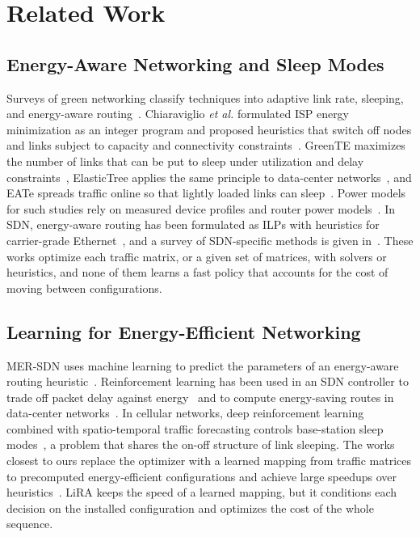 \documentclass[journal]{IEEEtran}
\begin{document}
\section{Related Work}\label{sec:related}

\subsection{Energy-Aware Networking and Sleep Modes}

Surveys of green networking classify techniques into adaptive link rate, sleeping, and energy-aware routing~\cite{bianzino2012survey,bolla2011energy}. Chiaraviglio \emph{et al.} formulated ISP energy minimization as an integer program and proposed heuristics that switch off nodes and links subject to capacity and connectivity constraints~\cite{chiaraviglio2012minimizing}. GreenTE maximizes the number of links that can be put to sleep under utilization and delay constraints~\cite{zhang2010greente}, ElasticTree applies the same principle to data-center networks~\cite{heller2010elastictree}, and EATe spreads traffic online so that lightly loaded links can sleep~\cite{vasic2010eate}. Power models for such studies rely on measured device profiles and router power models~\cite{mahadevan2009power,restrepo2009energy,vishwanath2014modeling}. In SDN, energy-aware routing has been formulated as ILPs with heuristics for carrier-grade Ethernet~\cite{maaloul2018carrier}, and a survey of SDN-specific methods is given in~\cite{assefa2019survey}. These works optimize each traffic matrix, or a given set of matrices, with solvers or heuristics, and none of them learns a fast policy that accounts for the cost of moving between configurations.

\subsection{Learning for Energy-Efficient Networking}

MER-SDN uses machine learning to predict the parameters of an energy-aware routing heuristic~\cite{assefa2018mersdn}. Reinforcement learning has been used in an SDN controller to trade off packet delay against energy~\cite{frohlich2021rl} and to compute energy-saving routes in data-center networks~\cite{zheng2022energysaving}. In cellular networks, deep reinforcement learning combined with spatio-temporal traffic forecasting controls base-station sleep modes~\cite{wu2021deepbsc}, a problem that shares the on-off structure of link sleeping. The works closest to ours replace the optimizer with a learned mapping from traffic matrices to precomputed energy-efficient configurations and achieve large speedups over heuristics~\cite{gomezdelahiz2025noms,gomezdelahiz2026tgcn}. LiRA keeps the speed of a learned mapping, but it conditions each decision on the installed configuration and optimizes the cost of the whole sequence.
\end{document}
